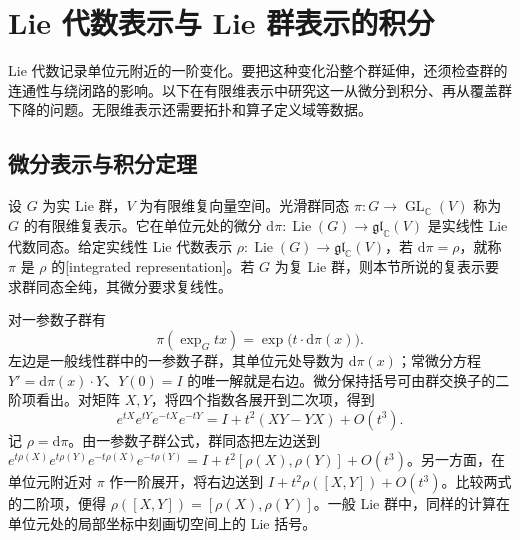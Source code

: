 
\section{Lie 代数表示与 Lie 群表示的积分}
\label{b5:sec:C01}

%
%

Lie 代数记录单位元附近的一阶变化。要把这种变化沿整个群延伸，还须检查群的连通性与绕闭路的影响。以下在有限维表示中研究这一从微分到积分、再从覆盖群下降的问题。无限维表示还需要拓扑和算子定义域等数据。

\subsection{微分表示与积分定理}
\label{b5:subsec:C01:01}

\begin{definition}\label{b5:def:lie-group-representation}
	设 \(G\) 为实 Lie 群，\(V\) 为有限维复向量空间。光滑群同态 \(\pi:G\to\operatorname{GL}_{\mathbb C}(V)\) 称为 \(G\) 的有限维复表示。它在单位元处的微分 \(\mathrm{d}\pi:\operatorname{Lie}(G)\to\mathfrak{gl}_{\mathbb C}(V)\) 是实线性 Lie 代数同态。给定实线性 Lie 代数表示 \(\rho:\operatorname{Lie}(G)\to\mathfrak{gl}_{\mathbb C}(V)\)，若 \(\mathrm{d}\pi=\rho\)，就称 \(\pi\) 是 \(\rho\) 的[integrated representation]。若 \(G\) 为复 Lie 群，则本节所说的复表示要求群同态全纯，其微分要求复线性。
\end{definition}

对一参数子群有
\[
	\pi(\exp_G tx)=\exp\bigl(t\cdot\mathrm{d}\pi(x)\bigr).
\]
左边是一般线性群中的一参数子群，其单位元处导数为 \(\mathrm{d}\pi(x)\)；常微分方程 \(Y'=\mathrm{d}\pi(x)\cdot Y\)、\(Y(0)=I\) 的唯一解就是右边。微分保持括号可由群交换子的二阶项看出。对矩阵 \(X,Y\)，将四个指数各展开到二次项，得到
\[
	e^{tX}e^{tY}e^{-tX}e^{-tY} =I+t^2(XY-YX)+O(t^3).
\]
记 \(\rho=\mathrm d\pi\)。由一参数子群公式，群同态把左边送到 \(e^{t\rho(X)}e^{t\rho(Y)}e^{-t\rho(X)}e^{-t\rho(Y)}=I+t^2[\rho(X),\rho(Y)]+O(t^3)\)。另一方面，在单位元附近对 \(\pi\) 作一阶展开，将右边送到 \(I+t^2\rho([X,Y])+O(t^3)\)。比较两式的二阶项，便得 \(\rho([X,Y])=[\rho(X),\rho(Y)]\)。一般 Lie 群中，同样的计算在单位元处的局部坐标中刻画切空间上的 Lie 括号。

